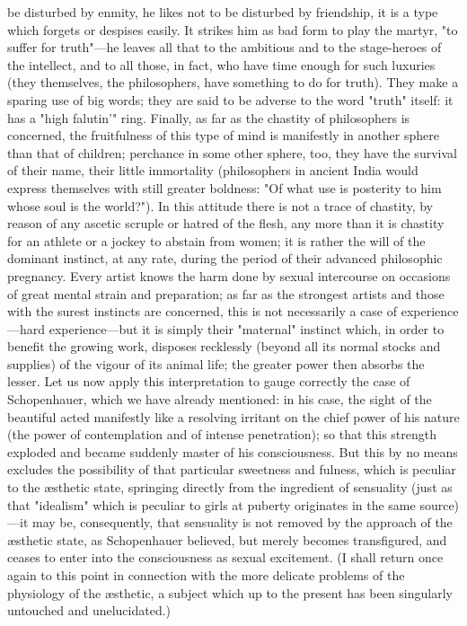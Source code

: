 \documentclass[12pt]{article}
\begin{document}
be disturbed by enmity, he likes not to be disturbed by friendship, it is a type which forgets or despises easily. It strikes him as bad form to play the martyr, "to suffer for truth"---he leaves all that to the ambitious and to the stage-heroes of the intellect, and to all those, in fact, who have time enough for such luxuries (they themselves, the philosophers, have something to do for truth). They make a sparing use of big words; they are said to be adverse to the word "truth" itself: it has a "high falutin'" ring. Finally, as far as the chastity of philosophers is concerned, the fruitfulness of this type of mind is manifestly in another sphere than that of children; perchance in some other sphere, too, they have the survival of their name, their little immortality (philosophers in ancient India would express themselves with still greater boldness: "Of what use is posterity to him whose soul is the world?"). In this attitude there is not a trace of chastity, by reason of any ascetic scruple or hatred of the flesh, any more than it is chastity for an athlete or a jockey to abstain from women; it is rather the will of the dominant instinct, at any rate, during the period of their advanced philosophic pregnancy. Every artist knows the harm done by sexual intercourse on occasions of great mental strain and preparation; as far as the strongest artists and those with the surest instincts are concerned, this is not necessarily a case of experience---hard experience---but it is simply their "maternal" instinct which, in order to benefit the growing work, disposes recklessly (beyond all its normal stocks and supplies) of the vigour of its animal life; the greater power then absorbs the lesser. Let us now apply this interpretation to gauge correctly the case of Schopenhauer, which we have already mentioned: in his case, the sight of the beautiful acted manifestly like a resolving irritant on the chief power of his nature (the power of contemplation and of intense penetration); so that this strength exploded and became suddenly master of his consciousness. But this by no means excludes the possibility of that particular sweetness and fulness, which is peculiar to the æsthetic state, springing directly from the ingredient of sensuality (just as that "idealism" which is peculiar to girls at puberty originates in the same source)---it may be, consequently, that sensuality is not removed by the approach of the æsthetic state, as Schopenhauer believed, but merely becomes transfigured, and ceases to enter into the consciousness as sexual excitement. (I shall return once again to this point in connection with the more delicate problems of the physiology of the æsthetic, a subject which up to the present has been singularly untouched and unelucidated.)
\end{document}

